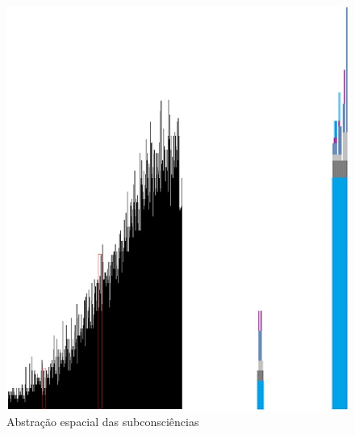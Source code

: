 \begin{figure}[H]
\caption{Abstração espacial das subconsciências}
\label{fig:consciousness_space_subconsciousness}
\centering
\includegraphics[scale=.5]{sections/images/consciousness_space_subconsciousness.jpg}
\end{figure}

